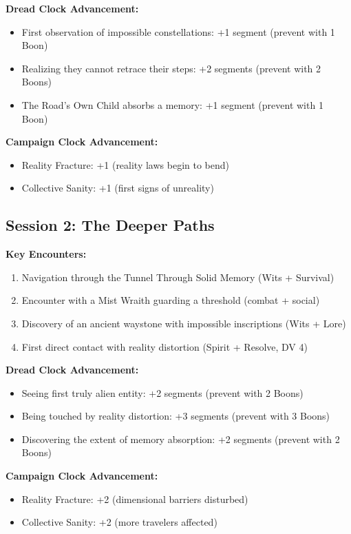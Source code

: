 \documentclass[11pt]{article}
\begin{document}
\textbf{Dread Clock Advancement:}
\begin{itemize}
\item First observation of impossible constellations: +1 segment (prevent with 1 Boon)
\item Realizing they cannot retrace their steps: +2 segments (prevent with 2 Boons)
\item The Road's Own Child absorbs a memory: +1 segment (prevent with 1 Boon)
\end{itemize}

\textbf{Campaign Clock Advancement:}
\begin{itemize}
\item Reality Fracture: +1 (reality laws begin to bend)
\item Collective Sanity: +1 (first signs of unreality)
\end{itemize}

\subsection{Session 2: The Deeper Paths}

\textbf{Key Encounters:}
\begin{enumerate}
\item Navigation through the Tunnel Through Solid Memory (Wits + Survival)
\item Encounter with a Mist Wraith guarding a threshold (combat + social)
\item Discovery of an ancient waystone with impossible inscriptions (Wits + Lore)
\item First direct contact with reality distortion (Spirit + Resolve, DV 4)
\end{enumerate}

\textbf{Dread Clock Advancement:}
\begin{itemize}
\item Seeing first truly alien entity: +2 segments (prevent with 2 Boons)
\item Being touched by reality distortion: +3 segments (prevent with 3 Boons)
\item Discovering the extent of memory absorption: +2 segments (prevent with 2 Boons)
\end{itemize}

\textbf{Campaign Clock Advancement:}
\begin{itemize}
\item Reality Fracture: +2 (dimensional barriers disturbed)
\item Collective Sanity: +2 (more travelers affected)
\end{itemize}
\end{document}

